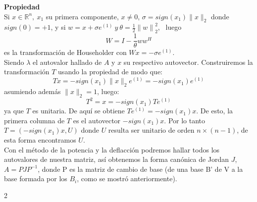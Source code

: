 \documentclass[12pt,a4paper]{article}
\begin{document}
\begin{multicols}{2}
\noindent\textbf{Propiedad}\\
\noindent Si $x \in\mathbb{R}^n, \ x_{1}$ su primera componente, $x\neq0$, $ \sigma=sign(x_{1})\|x\|_{2}$ donde $sign(0)=+1$, y si $w=x+\sigma e^{(1)} \ y \ \theta=\frac{1}{2}{\|w\|}^{2}_{2}$, \ luego $$W=I-\frac{1}{\theta}ww^{H}$$ es la transformación de Householder con $Wx=-\sigma e^{(1)}$.\\
Siendo $\lambda$ el autovalor hallado de $A$ y $x$ su respectivo autovector. Construiremos la transformación $T$ usando la propiedad de modo que:  $$Tx=-sign(x_{1})\|x\|_{2}e^{(1)}=-sign(x_{1})e^{(1)}$$ asumiendo además $\|x\|_{2}=1$, luego:\\
$$T^{2}=x=-sign(x_{1})Te^{(1)}$$ya que $T$ es unitaria. De aquí se obtiene $Te^{(1)}=-sign(x_{1})x$. De esto, la primera columna de $T$ es el autovector $-sign(x_{1})x$. Por lo tanto $T=(-sign(x_{1})x,U)$ donde $U$ resulta ser unitario de orden $n\times(n-1)$, de esta forma encontramos $U$. \\

\noindent Con el método de la potencia y la deflacción podremos hallar todos los autovalores de nuestra matriz, así obtenemos la forma canónica de Jordan $J$, $A=PJP^{-1}$, donde P es la matriz de cambio de base (de una base B' de V a la base formada por los $B_{i}$, como se mostró anteriormente).
\end{multicols}{2}
\newpage
\end{document}
